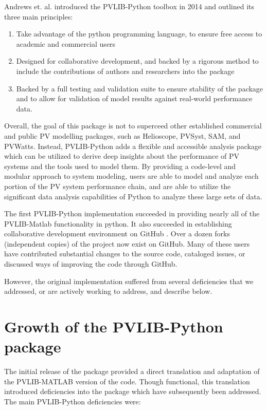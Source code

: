 \documentclass[conference]{IEEEtran}
\begin{document}
Andrews et. al. \cite{andrews} introduced the PVLIB-Python toolbox in 2014 and outlined its three main principles:

\begin{enumerate}
\item Take advantage of the python programming language, to ensure free access to academic and commercial users
\item Designed for collaborative development, and backed by a rigorous method to include the contributions of authors and researchers into the package
\item Backed by a full testing and validation suite to ensure stability of the package and to allow for validation of model results against real-world performance data.
\end{enumerate}

Overall, the goal of this package is not to superceed other established commercial and public PV modelling packages, such as Helioscope, PVSyst, SAM, and PVWatts. Instead, PVLIB-Python adds a flexible and accessible analysis package which can be utilized to derive deep insights about the performance of PV systems and the tools used to  model them. By providing a code-level and modular approach to system modeling, users are able to model and analyze each portion of the PV system performance chain, and are able to utilize the significant data analysis capabilities of Python to analyze these large sets of data. 

The first PVLIB-Python implementation succeeded in providing nearly all of the PVLIB-Matlab functionality in python.
It also succeeded in establishing collaborative development environment on GitHub \cite{pvlib-github}. 
Over a dozen forks (independent copies) of the project now exist on GitHub. 
Many of these users have contributed substantial changes to the source code, cataloged issues, or discussed ways of improving the code through GitHub.

However, the original implementation suffered from several deficiencies that we addressed, or are actively working to address, and describe below. 



\section{Growth of the PVLIB-Python package}

The initial release of the package provided a direct translation and adaptation of the PVLIB-MATLAB version of the code. Though functional, this translation introduced deficiencies into the package which have subsequently been addressed. The main PVLIB-Python deficiencies were:
\end{document}
